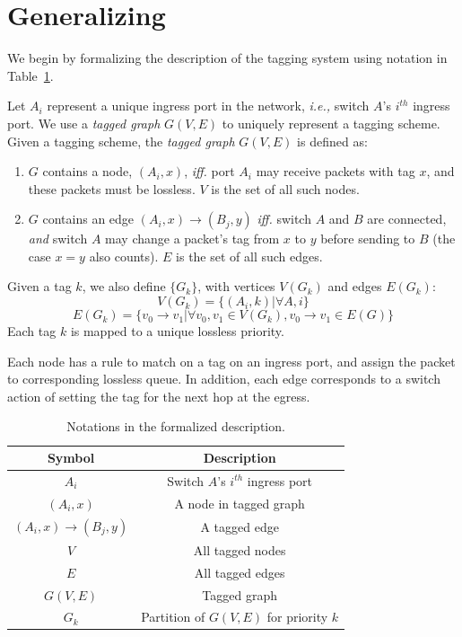 \section{Generalizing \sysname{}}
\label{sec:generic}

We begin by  formalizing the description of the tagging system using notation in
Table~\ref{tab:symbols}.

Let $A_i$ represent a unique ingress port in the network, {\em i.e.,} switch
$A$'s $i^{th}$ ingress port.  We use a {\em tagged graph} $G(V,E)$ to uniquely
represent a tagging scheme.  Given a tagging scheme, the {\em tagged graph}
$G(V,E)$ is defined as: 

\begin{enumerate}
\item $G$ contains a node, $(A_i, x)$, {\em iff.} port $A_i$ may receive packets with tag $x$, and these packets must 
be lossless. $V$ is the set of all such nodes.

\item $G$ contains an edge $(A_i, x)\rightarrow(B_j, y)$ {\em iff.} switch $A$ and $B$ are 
connected, {\em and} switch $A$ may change a packet's tag from $x$ to $y$ before sending to $B$ (the case $x=y$ also counts).
$E$ is the set of all such edges.

\end{enumerate}

Given a tag $k$, we also define $\{G_k\}$, with vertices $V(G_k)$ and edges
$E(G_k)$: 
$$V(G_k) = \{(A_i, k) | \forall A, i\} $$
$$E(G_k) = \{v_0 \rightarrow v_1 | \forall v_0, v_1 \in V(G_k),  v_0 \rightarrow v_1 \in E(G)\} $$
Each tag $k$ is mapped to a unique lossless priority.  

Each node has a rule to match on a tag on an ingress port, and assign the packet
to corresponding lossless queue.  In addition, each edge corresponds to a switch
action of setting the tag for the next hop at the egress.

\begin{table}[t]
\small
\centering
\begin{tabular}{|c|c|}
\hline
Symbol & Description \\ \hline
$A_i$ & Switch $A$'s $i^{th}$ ingress port  \\ \hline
$(A_i, x)$ & A node in tagged graph \\ \hline
$(A_i, x)\rightarrow(B_j, y)$ & A tagged edge \\ \hline
$V$ & All tagged nodes  \\ \hline
$E$ & All tagged edges \\ \hline
$G(V, E)$ & Tagged graph \\ \hline
$G_k$ & Partition of $G(V,E)$ for priority $k$ \\ \hline
\end{tabular}
\caption{Notations in the formalized description.}
\label{tab:symbols}
		\vspace{-1em}
\end{table}

